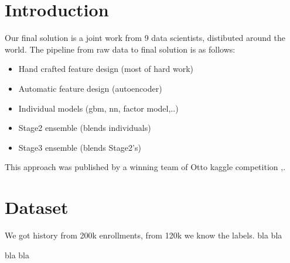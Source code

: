 \section{Introduction}
Our final solution is a joint work from 9 data scientists, distibuted around the world.
The pipeline from raw data to final solution is as follows:
\begin{itemize}
  \item Hand crafted feature design (most of hard work)
  \item Automatic feature design (autoencoder)
  \item Individual models (gbm, nn, factor model,..)
  \item Stage2 ensemble (blends individuals)
  \item Stage3 ensemble (blends Stage2's)
\end{itemize}

This approach was published by a winning team of Otto kaggle competition \cite{otto},\cite{triskelion}.

\section{Dataset}
We got history from 200k enrollments, from 120k we know the labels.
bla bla

bla bla